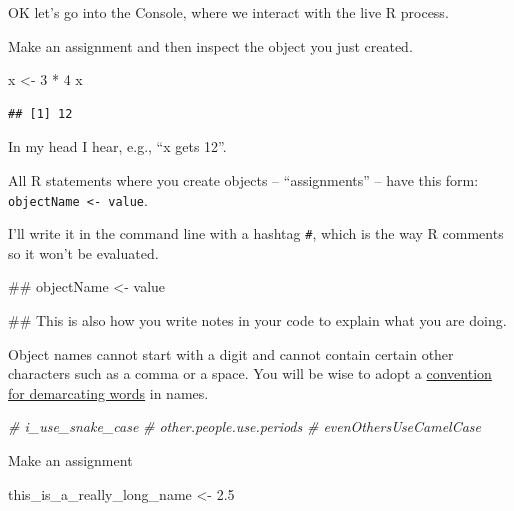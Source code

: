 \documentclass[]{book}
\newenvironment{Shaded}{\begin{snugshade}}{\end{snugshade}}
\newcommand{\DecValTok}[1]{\textcolor[rgb]{0.00,0.00,0.81}{{#1}}}
\newcommand{\FloatTok}[1]{\textcolor[rgb]{0.00,0.00,0.81}{{#1}}}
\newcommand{\StringTok}[1]{\textcolor[rgb]{0.31,0.60,0.02}{{#1}}}
\newcommand{\CommentTok}[1]{\textcolor[rgb]{0.56,0.35,0.01}{\textit{{#1}}}}
\newcommand{\NormalTok}[1]{{#1}}
\theoremstyle{definition}
\theoremstyle{definition}
\theoremstyle{definition}
\theoremstyle{remark}
\begin{document}
OK let's go into the Console, where we interact with the live R process.

Make an assignment and then inspect the object you just created.

\begin{Shaded}
\begin{Highlighting}[]
\NormalTok{x <-}\StringTok{ }\DecValTok{3} \NormalTok{*}\StringTok{ }\DecValTok{4}
\NormalTok{x}
\end{Highlighting}
\end{Shaded}

\begin{verbatim}
## [1] 12
\end{verbatim}

In my head I hear, e.g., ``x gets 12''.

All R statements where you create objects -- ``assignments'' -- have
this form: \texttt{objectName\ \textless{}-\ value}.

I'll write it in the command line with a hashtag \texttt{\#}, which is
the way R comments so it won't be evaluated.

\begin{Shaded}
\begin{Highlighting}[]
\NormalTok{## objectName <- value}

\NormalTok{## This is also how you write notes in your code to explain what you are doing.}
\end{Highlighting}
\end{Shaded}

Object names cannot start with a digit and cannot contain certain other
characters such as a comma or a space. You will be wise to adopt a
\href{http://en.wikipedia.org/wiki/Snake_case}{convention for
demarcating words} in names.

\begin{Shaded}
\begin{Highlighting}[]
\CommentTok{# i_use_snake_case}
\CommentTok{# other.people.use.periods}
\CommentTok{# evenOthersUseCamelCase}
\end{Highlighting}
\end{Shaded}

Make an assignment

\begin{Shaded}
\begin{Highlighting}[]
\NormalTok{this_is_a_really_long_name <-}\StringTok{ }\FloatTok{2.5}
\end{Highlighting}
\end{Shaded}
\end{document}
